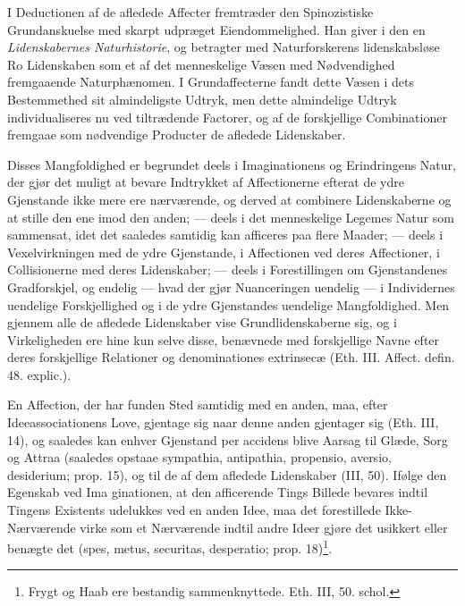 \documentclass[12pt,a4paper]{book}
\newcommand{\opage}[1]{\marginnote{\footnotesize\textit{[#1]}}}
\begin{document}
I Deductionen af de afledede Affecter fremtræder den
Spinozistiske Grundanskuelse med skarpt udpræget Eiendommelighed.
Han giver i den en \emph{Lidenskabernes
Naturhistorie}, og betragter med Naturforskerens lidenskabsløse
Ro Lidenskaben som et af det menneskelige Væsen
med Nødvendighed fremgaaende Naturphænomen. I Grundaffecterne
fandt dette Væsen i dets Bestemmethed sit almindeligste
Udtryk, men dette almindelige Udtryk individualiseres
nu ved tiltrædende Factorer, og af de forskjellige
Combinationer fremgaae som nødvendige Producter de afledede
Lidenskaber.

Disses Mangfoldighed er begrundet deels i Imaginationens
og Erindringens Natur, der gjør det muligt at bevare
Indtrykket af Affectionerne efterat de ydre Gjenstande
ikke mere ere nærværende, og derved at combinere Lidenskaberne
og at stille den ene imod den anden; --- deels i
det menneskelige Legemes Natur som sammensat, idet det
saaledes samtidig kan afficeres paa flere Maader; --- deels
i Vexelvirkningen med de ydre Gjenstande, i Affectionen
ved deres Affectioner, i Collisionerne med deres Lidenskaber;
--- deels i Forestillingen om Gjenstandenes Gradforskjel,
og endelig --- hvad der gjør Nuanceringen uendelig
--- i Individernes uendelige Forskjellighed og i de ydre
Gjenstandes uendelige Mangfoldighed. Men gjennem alle
de afledede Lidenskaber vise Grundlidenskaberne sig, og i
Virkeligheden ere hine kun selve disse, benævnede med forskjellige
Navne efter deres forskjellige Relationer og denominationes
extrinsecæ (Eth. III. Affect. defin. 48. explic.).

En Affection, der har funden Sted samtidig med en
anden, maa, efter Ideeassociationens Love, gjentage sig
naar denne anden gjentager sig (Eth. III, 14), og saaledes
kan enhver Gjenstand per accidens blive Aarsag til Glæde,
Sorg og Attraa (saaledes opstaae sympathia, antipathia, propensio,
aversio, desiderium; prop. 15), og til de af dem afledede
Lidenskaber (III, 50). Ifølge den Egenskab ved Ima\-%
\opage{116}\setcounter{footnote}{0}%
ginationen, at den afficerende Tings Billede bevares indtil
Tingens Existents udelukkes ved en anden Idee, maa det
forestillede Ikke-Nærværende virke som et Nærværende indtil
andre Ideer gjøre det usikkert eller benægte det (spes,
metus, securitas, desperatio; prop.
18)\footnote{Frygt og Haab ere bestandig sammenknyttede.
Eth. III, 50. schol.}.
\end{document}
